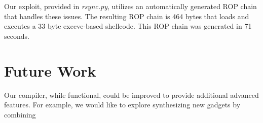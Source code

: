 \documentclass[journal]{IEEEtran}
\begin{document}
Our exploit, provided in \emph{rsync.py}, utilizes an automatically generated ROP chain that handles these issues.
The resulting ROP chain is 464 bytes that loads and executes a 33 byte execve-based shellcode.
This ROP chain was generated in 71 seconds.

\section{Future Work}
Our compiler, while functional, could be improved to provide additional advanced
features. For example, we would like to explore synthesizing new gadgets by
combining 


{}
\end{document}
